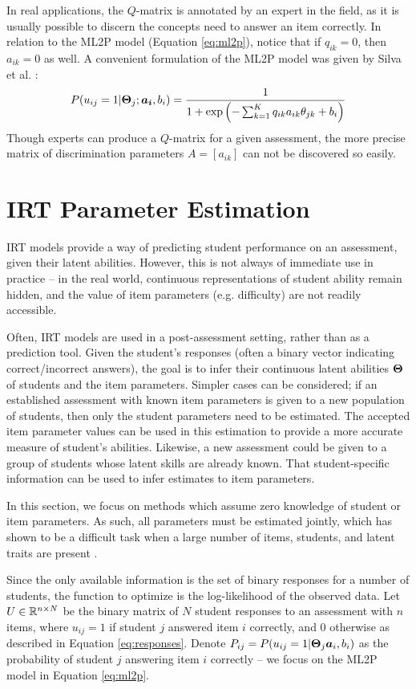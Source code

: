 In real applications, the $Q$-matrix is annotated by an expert in the field, as it is usually possible to discern the concepts need to answer an item correctly. In relation to the ML2P model (Equation \ref{eq:ml2p}), notice that if $q_{ik} = 0$, then $a_{ik} = 0$ as well. A convenient formulation of the ML2P model was given by Silva et al. \cite{daSilva2018}:
\begin{equation}
  P(u_{ij} = 1 | \boldsymbol{\Theta}_j; \boldsymbol{a_i}, b_i) = \frac{1}{1 + \exp\left(-\sum_{k=1}^K q_{ik} a_{ik} \theta_{jk} + b_i \right)}
  \label{eq:ml2pq}
\end{equation}
Though experts can produce a $Q$-matrix for a given assessment, the more precise matrix of discrimination parameters $A = [a_{ik}]$ can not be discovered so easily.

\section{IRT Parameter Estimation} \label{sec:irt_est_background}
IRT models provide a way of predicting student performance on an assessment, given their latent abilities. However, this is not always of immediate use in practice -- in the real world, continuous representations of student ability remain hidden, and the value of item parameters (e.g. difficulty) are not readily accessible.

Often, IRT models are used in a post-assessment setting, rather than as a prediction tool. Given the student's responses (often a binary vector indicating correct/incorrect answers), the goal is to infer their continuous latent abilities $\boldsymbol{\Theta}$ of students and the item parameters. Simpler cases can be considered; if an established assessment with known item parameters is given to a new population of students, then only the student parameters need to be estimated. The accepted item parameter values can be used in this estimation to provide a more accurate measure of student's abilities. Likewise, a new assessment could be given to a group of students whose latent skills are already known. That student-specific information can be used to infer estimates to item parameters.

In this section, we focus on methods which assume zero knowledge of student or item parameters. As such, all parameters must be estimated jointly, which has shown to be a difficult task when a large number of items, students, and latent traits are present \cite{cai2009}. 

Since the only available information is the set of binary responses for a number of students, the function to optimize is the log-likelihood of the observed data. Let $U \in \mathbb{R}^{n \times N}$ be the binary matrix of $N$ student responses to an assessment with $n$ items, where $u_{ij} = 1$ if student $j$ answered item $i$ correctly, and $0$ otherwise as described in Equation \ref{eq:responses}. Denote $P_{ij} = P(u_{ij} = 1 | \boldsymbol{\Theta}_j \boldsymbol{a}_i, b_i)$ as the probability of student $j$ answering item $i$ correctly -- we focus on the ML2P model in Equation \ref{eq:ml2p}.

